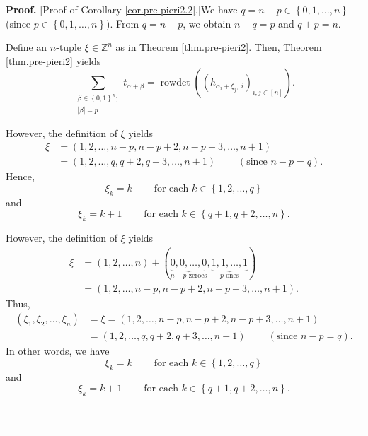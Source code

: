 \documentclass[numbers=enddot,12pt,final,onecolumn,notitlepage,english]{scrartcl}%
\theoremstyle{definition}
\newenvironment{proof}[1][Proof]{\noindent\textbf{#1.} }{\ \rule{0.5em}{0.5em}}
\let\sumnonlimits\sum
\renewcommand{\sum}{\sumnonlimits\limits}
\newenvironment{verlong}{}{}
\newenvironment{vershort}{}{}
\begin{document}
\begin{proof}
[Proof of Corollary \ref{cor.pre-pieri2.2}.]We have $q=n-p\in\left\{
0,1,\ldots,n\right\}  $ (since $p\in\left\{  0,1,\ldots,n\right\}  $). From
$q=n-p$, we obtain $n-q=p$ and $q+p=n$.

Define an $n$-tuple $\xi\in\mathbb{Z}^{n}$ as in Theorem \ref{thm.pre-pieri2}.
Then, Theorem \ref{thm.pre-pieri2} yields%
\begin{equation}
\sum_{\substack{\beta\in\left\{  0,1\right\}  ^{n};\\\left\vert \beta
\right\vert =p}}t_{\alpha+\beta}=\operatorname*{rowdet}\left(  \left(
h_{\alpha_{i}+\xi_{j},\ i}\right)  _{i,j\in\left[  n\right]  }\right)  .
\label{pf.cor.pre-pieri2.2.1}%
\end{equation}


\begin{vershort}
However, the definition of $\xi$ yields%
\begin{align*}
\xi &  =\left(  1,2,\ldots,n-p,n-p+2,n-p+3,\ldots,n+1\right) \\
&  =\left(  1,2,\ldots,q,q+2,q+3,\ldots,n+1\right)
\ \ \ \ \ \ \ \ \ \ \left(  \text{since }n-p=q\right)  .
\end{align*}
Hence,
\begin{equation}
\xi_{k}=k\ \ \ \ \ \ \ \ \ \ \text{for each }k\in\left\{  1,2,\ldots
,q\right\}  \label{pf.cor.pre-pieri2.2.short.fn2.1}%
\end{equation}
and%
\begin{equation}
\xi_{k}=k+1\ \ \ \ \ \ \ \ \ \ \text{for each }k\in\left\{  q+1,q+2,\ldots
,n\right\}  . \label{pf.cor.pre-pieri2.2.short.fn2.2}%
\end{equation}

\end{vershort}

\begin{verlong}
However, the definition of $\xi$ yields%
\begin{align*}
\xi &  =\left(  1,2,\ldots,n\right)  +\left(  \underbrace{0,0,\ldots
,0}_{n-p\text{ zeroes}},\underbrace{1,1,\ldots,1}_{p\text{ ones}}\right) \\
&  =\left(  1,2,\ldots,n-p,n-p+2,n-p+3,\ldots,n+1\right)  .
\end{align*}
Thus,
\begin{align*}
\left(  \xi_{1},\xi_{2},\ldots,\xi_{n}\right)   &  =\xi=\left(  1,2,\ldots
,n-p,n-p+2,n-p+3,\ldots,n+1\right) \\
&  =\left(  1,2,\ldots,q,q+2,q+3,\ldots,n+1\right)
\ \ \ \ \ \ \ \ \ \ \left(  \text{since }n-p=q\right)  .
\end{align*}
In other words, we have%
\begin{equation}
\xi_{k}=k\ \ \ \ \ \ \ \ \ \ \text{for each }k\in\left\{  1,2,\ldots
,q\right\}  \label{pf.cor.pre-pieri2.2.fn2.1}%
\end{equation}
and%
\begin{equation}
\xi_{k}=k+1\ \ \ \ \ \ \ \ \ \ \text{for each }k\in\left\{  q+1,q+2,\ldots
,n\right\}  . \label{pf.cor.pre-pieri2.2.fn2.2}%
\end{equation}


\end{verlong}
\end{proof}
\end{document}
